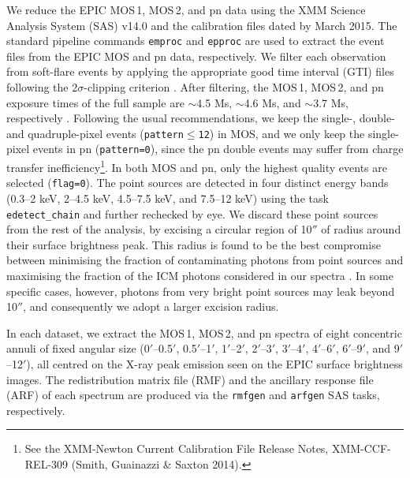 \documentclass{aa}
\begin{document}
We reduce the EPIC MOS\,1, MOS\,2, and pn data using the XMM Science Analysis System (SAS) v14.0 and the calibration files dated by March 2015. The standard pipeline commands \texttt{emproc} and \texttt{epproc} are used to extract the event files from the EPIC MOS and pn data, respectively. We filter each observation from soft-flare events by applying the appropriate good time interval (GTI) files following the 2$\sigma$-clipping criterion \citep{2015A&A...575A..37M}. After filtering, the MOS\,1, MOS\,2, and pn exposure times of the full sample are $\sim$4.5 Ms, $\sim$4.6 Ms, and $\sim$3.7 Ms, respectively \citep[see Table 1 of][]{2016A&A...592A.157M}. Following the usual recommendations, we keep the single-, double- and quadruple-pixel events (\texttt{pattern$\le$12}) in MOS, and we only keep the single-pixel events in pn (\texttt{pattern=0}), since the pn double events may suffer from charge transfer inefficiency\footnote{See the XMM-Newton Current Calibration File Release Notes, XMM-CCF-REL-309 (Smith, Guainazzi \& Saxton 2014).}. In both MOS and pn, only the highest quality events are selected (\texttt{flag=0}). The point sources are detected in four distinct energy bands (0.3--2 keV, 2--4.5 keV, 4.5--7.5 keV, and 7.5--12 keV) using the task \texttt{edetect\_chain} and further rechecked by eye. We discard these point sources from the rest of the analysis, by excising a circular region of 10$''$ of radius around their surface brightness peak. This radius is found to be the best compromise between minimising the fraction of contaminating photons from point sources and maximising the fraction of the ICM photons considered in our spectra \citep{2015A&A...575A..37M}. In some specific cases, however, photons from very bright point sources may leak beyond 10$''$, and consequently we adopt a larger excision radius.

In each dataset, we extract the MOS\,1, MOS\,2, and pn spectra of eight concentric annuli of fixed angular size (0$'$--0.5$'$, 0.5$'$--1$'$, 1$'$--2$'$, 2$'$--3$'$, 3$'$--4$'$, 4$'$--6$'$, 6$'$--9$'$, and 9$'$--12$'$), all centred on the X-ray peak emission seen on the EPIC surface brightness images. The redistribution matrix file (RMF) and the ancillary response file (ARF) of each spectrum are produced via the \texttt{rmfgen} and \texttt{arfgen} SAS tasks, respectively.
\end{document}
